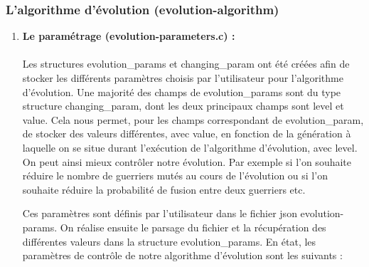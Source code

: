 \documentclass[french]{article}
\begin{document}
        \subsubsection{L'algorithme d'évolution (evolution-algorithm)}
            \begin{enumerate}
                \item \textbf {Le paramétrage (evolution-parameters.c) :} 
                    \paragraph{}Les structures evolution\_params et changing\_param ont été créées afin de stocker les différents paramètres choisis par l'utilisateur pour l'algorithme d'évolution. Une majorité des champs de evolution\_params sont du type structure changing\_param, dont les deux principaux champs sont level et value. Cela nous permet, pour les champs correspondant de evolution\_param, de stocker des valeurs différentes, avec value, en fonction de la génération à laquelle on se situe durant l'exécution de l'algorithme d'évolution, avec level. On peut ainsi mieux contrôler notre évolution. Par exemple si l'on souhaite réduire le nombre de guerriers mutés au cours de l'évolution ou si l'on souhaite réduire la probabilité de fusion entre deux guerriers etc. 
                    \bigskip
                    
                    Ces paramètres sont définis par l'utilisateur dans le fichier json evolution-params. On réalise ensuite le parsage du fichier et la récupération des différentes valeurs dans la structure evolution\_params. En état, les paramètres de contrôle de notre algorithme d'évolution sont les suivants  : 
                    

\end{enumerate}
\end{document}

